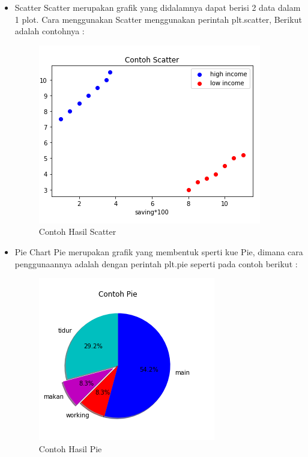 \begin{itemize}	
	\item Scatter\newline
	Scatter merupakan grafik yang didalamnya dapat berisi 2 data dalam 1 plot.\newline
	Cara menggunakan Scatter menggunakan perintah plt.scatter, Berikut adalah contohnya :

	

\begin{figure}[h]
\centering
\includegraphics[scale=0.5]{figures/6/Teori/1174002/no3scatter.png}
\caption{Contoh Hasil Scatter}
\label{fig:contoh}
\end{figure}
\end{itemize}

\begin{itemize}
	\item Pie\newline
	Chart Pie merupakan grafik yang membentuk sperti kue Pie, dimana cara penggunaannya adalah dengan perintah
	plt.pie seperti pada contoh berikut :
	
	

\begin{figure}[h]
\centering
\includegraphics[scale=0.6]{figures/6/Teori/1174002/no3pie.png}
\caption{Contoh Hasil Pie}
\label{fig:contoh Pie}
\end{figure}


\end{itemize}

